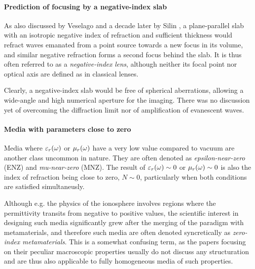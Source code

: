 \paragraph{Prediction of focusing by a negative-index slab} %
As also discussed by Veselago \cite[p. 511]{veselago1968} and a decade later by Silin \cite{silin1978possibility},  %
a plane-parallel slab with an isotropic negative index of refraction and sufficient thickness would refract waves emanated from a point source towards a new focus in its volume, and similar negative refraction forms a second focus behind the slab. It is thus often referred to as a \textit{negative-index lens}, although neither its focal point nor optical axis are defined as in classical lenses.

Clearly, a negative-index slab would be free of spherical aberrations, allowing a wide-angle and high numerical aperture for the imaging. There was no discussion yet of overcoming the diffraction limit nor of amplification of evanescent waves.  %

\paragraph{Media with parameters close to zero}%
Media where $\varepsilon_r(\omega)$ or $\mu_r(\omega)$ have a very low value compared to vacuum are another class uncommon in nature. They are often denoted as \textit{epsilon-near-zero} (ENZ) and \textit{mu-near-zero} (MNZ).
The result of $\varepsilon_r(\omega)\sim 0$ or $\mu_r(\omega)\sim 0$ is also the index of refraction being close to zero, $N\sim 0$, particularly when both conditions are satisfied simultaneusly. 

Although e.g. the physics of the ionosphere involves regions where the permittivity transits from negative to positive values, the scientific interest in designing such media significantly grew
after the merging of the paradigm with metamaterials, and therefore such media are often denoted syncretically as \textit{zero-index metamaterials}. This is a somewhat confusing term, as the papers focusing on their peculiar macroscopic properties \cite{basharin2013epsilon} 
usually do not discuss any structuration and are thus also applicable to fully homogeneous media of such properties.

